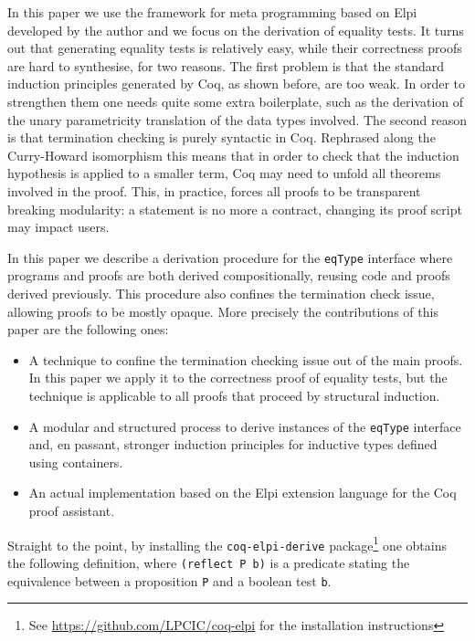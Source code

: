 \documentclass[sigplan,10pt,review]{acmart}\settopmatter{printfolios=true,printccs=false,printacmref=false}
\begin{document}
In this paper we use the framework for meta programming based on
Elpi~\cite{dunchev:hal-01176856,tassi:hal-01637063} developed by the
author and we focus on the derivation of equality tests.
It turns out that generating equality tests is relatively easy,
while their correctness proofs are hard to synthesise, for two reasons. 
The first problem is that 
the standard induction principles generated by Coq, as shown
before, are too weak. In order to strengthen them one needs quite some extra
boilerplate, such as the derivation of the unary parametricity
translation of the data types involved.
The second reason is that termination checking
is purely syntactic in Coq. Rephrased along the Curry-Howard
isomorphism this means that in order to check that the induction
hypothesis is applied to a smaller term, Coq may need to unfold all
theorems involved in the proof. This, in practice, forces all proofs to
be transparent breaking modularity: a statement is no more a contract,
changing its proof script may impact users.

In this paper we describe a derivation procedure for the
\lstinline+eqType+ interface where programs and proofs are both
derived compositionally, reusing code and proofs derived previously.
This procedure also confines the termination check issue,
allowing proofs to be mostly opaque.
More precisely the contributions of this paper are the following ones:
\begin{itemize}
\item A technique to confine the termination checking issue out of the
	main proofs. In this paper we apply it to the correctness
	proof of equality
	tests, but the technique is applicable to all proofs 
	that proceed by structural
	induction.

\item A modular and structured process to derive instances of the
	\lstinline+eqType+ interface and, en passant, stronger
	induction principles for inductive types defined using
	containers.

\item An actual implementation based on the Elpi extension language
	for the Coq proof assistant.
\end{itemize}

\noindent
Straight to the point, by installing the \lstinline+coq-elpi-derive+
package\footnote{See \url{https://github.com/LPCIC/coq-elpi} for the
installation instructions} 
one obtains the following definition, where \lstinline+(reflect P b)+
is a predicate stating the equivalence between a proposition
\lstinline+P+ and a boolean test \lstinline+b+.
\end{document}
